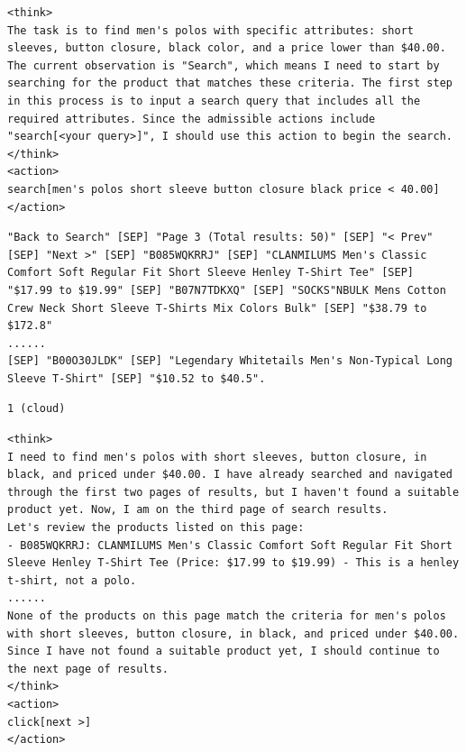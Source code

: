 \documentclass{article}
\begin{document}
\begin{cloudbox}[title=Step 1: cloud agent output ((if routed)]
\begin{lstlisting}[style=mytt]
<think>
The task is to find men's polos with specific attributes: short sleeves, button closure, black color, and a price lower than $40.00. The current observation is "Search", which means I need to start by searching for the product that matches these criteria. The first step in this process is to input a search query that includes all the required attributes. Since the admissible actions include "search[<your query>]", I should use this action to begin the search.
</think>
<action>
search[men's polos short sleeve button closure black price < 40.00]
</action>
\end{lstlisting}
\end{cloudbox}

\begin{envbox}[title=Step 4: environment]
\begin{lstlisting}[style=mytt]
"Back to Search" [SEP] "Page 3 (Total results: 50)" [SEP] "< Prev" [SEP] "Next >" [SEP] "B085WQKRRJ" [SEP] "CLANMILUMS Men's Classic Comfort Soft Regular Fit Short Sleeve Henley T-Shirt Tee" [SEP] "$17.99 to $19.99" [SEP] "B07N7TDKXQ" [SEP] "SOCKS"NBULK Mens Cotton Crew Neck Short Sleeve T-Shirts Mix Colors Bulk" [SEP] "$38.79 to $172.8"
......
[SEP] "B00O30JLDK" [SEP] "Legendary Whitetails Men's Non-Typical Long Sleeve T-Shirt" [SEP] "$10.52 to $40.5".
\end{lstlisting}
\end{envbox}

\begin{herabox}[title=Step 4: Hera decision]
\begin{lstlisting}[style=mytt]
1 (cloud)
\end{lstlisting}
\end{herabox}

\begin{cloudbox}[title=Step 4: cloud agent output]
\begin{lstlisting}[style=mytt]
<think>
I need to find men's polos with short sleeves, button closure, in black, and priced under $40.00. I have already searched and navigated through the first two pages of results, but I haven't found a suitable product yet. Now, I am on the third page of search results.
Let's review the products listed on this page:
- B085WQKRRJ: CLANMILUMS Men's Classic Comfort Soft Regular Fit Short Sleeve Henley T-Shirt Tee (Price: $17.99 to $19.99) - This is a henley t-shirt, not a polo.
......
None of the products on this page match the criteria for men's polos with short sleeves, button closure, in black, and priced under $40.00. Since I have not found a suitable product yet, I should continue to the next page of results.
</think>
<action>
click[next >]
</action>
\end{lstlisting}
\end{cloudbox}
\end{document}
